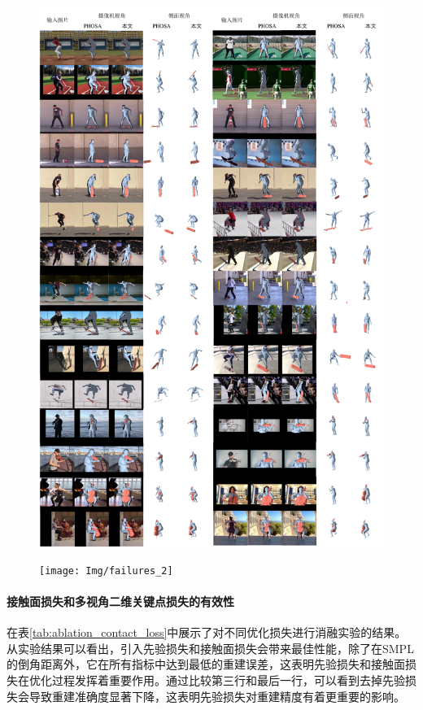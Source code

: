\begin{figure}[!htbp]
	\centering
	\includegraphics[width=\linewidth]{Img/qualitative_results_sup_3}
	\label{fig:comparison-with-phosa3}
\end{figure}

\begin{figure}[!htbp]
	\centering
	\texttt{[image: Img/failures\_2]}
	\label{fig:failures}
\end{figure}

\paragraph{接触面损失和多视角二维关键点损失的有效性}
在表\ref{tab:ablation_contact_loss}中展示了对不同优化损失进行消融实验的结果。从实验结果可以看出，引入先验损失和接触面损失会带来最佳性能，除了在SMPL的倒角距离外，它在所有指标中达到最低的重建误差，这表明先验损失和接触面损失在优化过程发挥着重要作用。通过比较第三行和最后一行，可以看到去掉先验损失会导致重建准确度显著下降，这表明先验损失对重建精度有着更重要的影响。

